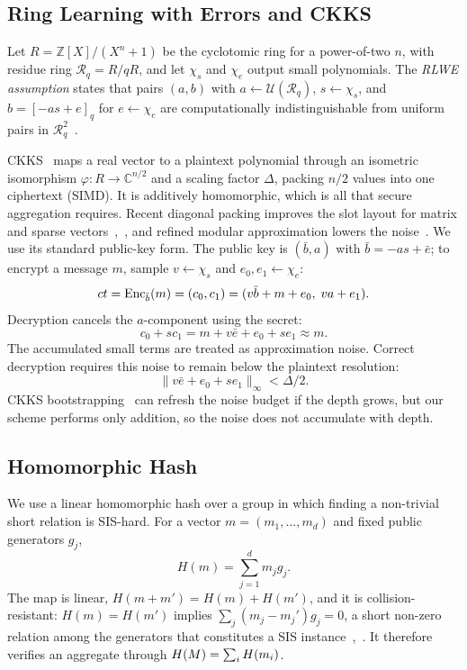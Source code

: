\subsection{Ring Learning with Errors and CKKS}
\label{subsec:rlwe}
Let $R=\mathbb{Z}[X]/(X^n+1)$ be the cyclotomic ring for a power-of-two $n$, with residue ring $\mathcal{R}_q=R/qR$, and let $\chi_s$ and $\chi_e$ output small polynomials. The \emph{RLWE assumption} states that pairs $(a,b)$ with $a\leftarrow\mathcal{U}(\mathcal{R}_q)$, $s\leftarrow\chi_s$, and $b=[-as+e]_q$ for $e\leftarrow\chi_e$ are computationally indistinguishable from uniform pairs in $\mathcal{R}_q^2$~\cite{lyubashevsky2010ideal}.

CKKS~\cite{cheon2017ckks} maps a real vector to a plaintext polynomial through an isometric isomorphism $\varphi:R\to\mathbb{C}^{n/2}$ and a scaling factor $\Delta$, packing $n/2$ values into one ciphertext (SIMD). It is additively homomorphic, which is all that secure aggregation requires. Recent diagonal packing improves the slot layout for matrix and sparse vectors~\cite{lee2026hydia},~\cite{deryabin2026packing}, and refined modular approximation lowers the noise~\cite{zhang2026efficient}. We use its standard public-key form. The public key is $(\bar b,a)$ with $\bar b=-as+\bar e$; to encrypt a message $m$, sample $v\leftarrow\chi_s$ and $e_0,e_1\leftarrow\chi_e$:
\begin{equation}
  \label{eq:ckks-enc}
  ct=\operatorname{Enc}_{\bar b}(m)=(c_0,c_1)=(v\bar b+m+e_0,\; va+e_1).
\end{equation}
Decryption cancels the $a$-component using the secret:
\begin{equation}
  \label{eq:ckks-dec}
  c_0+s c_1=m+v\bar e+e_0+s e_1\approx m .
\end{equation}
The accumulated small terms are treated as approximation noise. Correct decryption requires this noise to remain below the plaintext resolution:
\begin{equation}
  \label{eq:noise-bound}
  \|v\bar e+e_0+s e_1\|_\infty < \Delta/2 .
\end{equation}
CKKS bootstrapping~\cite{cheon2018bootstrapping} can refresh the noise budget if the depth grows, but our scheme performs only addition, so the noise does not accumulate with depth.

\subsection{Homomorphic Hash}
\label{subsec:hash}
We use a linear homomorphic hash over a group in which finding a non-trivial short relation is SIS-hard. For a vector $m=(m_1,\ldots,m_d)$ and fixed public generators $g_j$,
\begin{equation}
  \label{eq:homhash}
  H(m)=\sum_{j=1}^{d} m_j g_j .
\end{equation}
The map is linear, $H(m+m')=H(m)+H(m')$, and it is collision-resistant: $H(m)=H(m')$ implies $\sum_j(m_j-m_j')g_j=0$, a short non-zero relation among the generators that constitutes a SIS instance~\cite{krohn2004fly},~\cite{micciancio2001svp}. It therefore verifies an aggregate through $H(M)=\sum_i H(m_i)$.

